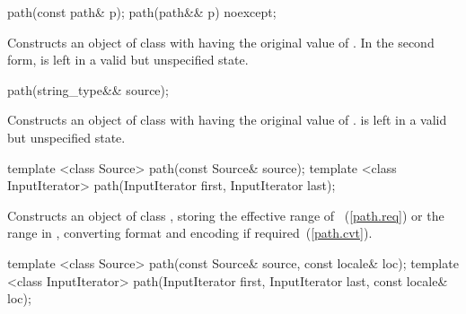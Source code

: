 \begin{itemdecl}
path(const path& p);
path(path&& p) noexcept;
\end{itemdecl}

\begin{itemdescr}
\pnum
\effects
Constructs an object of class  with
 having the original value of .
In the second form,  is left in a valid but unspecified state.
\end{itemdescr}

\begin{itemdecl}
path(string_type&& source);
\end{itemdecl}

\begin{itemdescr}
\pnum
\effects
Constructs an object of class  with
 having the original value of .
 is left in a valid but unspecified state.
\end{itemdescr}

\begin{itemdecl}
template <class Source>
  path(const Source& source);
template <class InputIterator>
  path(InputIterator first, InputIterator last);
\end{itemdecl}

\begin{itemdescr}
\pnum
\effects Constructs an object of class , storing the effective range of ~(\ref{path.req})
  or the range  in ,
  converting format and encoding if required~(\ref{path.cvt}).
\end{itemdescr}

\begin{itemdecl}
template <class Source>
  path(const Source& source, const locale& loc);
template <class InputIterator>
  path(InputIterator first, InputIterator last, const locale& loc);
\end{itemdecl}

